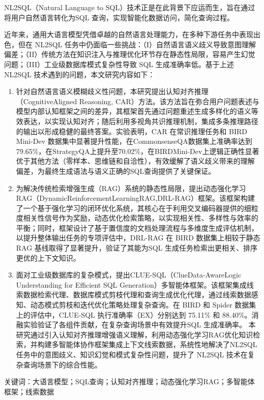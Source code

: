 \documentclass[12pt,a4paper,openright,UTF8]{ctexbook}
\begin{document}
NL2SQL（Natural Language to SQL）技术正是在此背景下应运而生，旨在通过将用户自然语言转化为SQL 查询，实现智能化数据访问，简化查询过程。


近年来，通用大语言模型凭借卓越的自然语言处理能力，在多种下游任务中表现出色，但在 NL2SQL 任务中仍面临一些挑战：（I）自然语言语义歧义导致意图理解偏差；（II）传统方法在知识注入与推理优化环节存在静态性局限，容易产生幻觉问题；（III）工业级数据库模式复杂性导致 SQL 生成准确率低。基于上述NL2SQL 技术遇到的问题，本文研究内容如下：

\begin{enumerate}[label=(\arabic*)]
\item 针对自然语言语义模糊歧义性问题，本研究提出认知对齐推理（CognitiveAligned Reasoning, CAR）方法。该方法旨在弥合用户问题表述与模型内部认知框架之间的差异，其框架首先通过问题重述生成多样化的语义等效表达，以实现认知对齐；随后利用多视角共识推理机制，集成多条推理路径的输出以形成稳健的最终答案。实验表明，CAR 在常识推理任务和 BIRD Mini-Dev 数据集中显著提升性能，在CommonsenseQA数据集上准确率达到79.65\%，在StrategyQA上提升至70.02\%，在BIRDMini-Dev上逻辑正确性显著优于其他方法（零样本、思维链和自洽性），有效缓解了语义歧义带来的理解偏差，为最终生成语法与语义正确的SQL查询提供了关键保证。
\item 为解决传统检索增强生成（RAG）系统的静态性局限，提出动态强化学习RAG（DynamicReinforcementLearningRAG,DRL-RAG）框架。该框架构建了一个基于强化学习的闭环优化系统，其核心在于利用交叉编码器提供的细粒度相关性信号作为奖励，动态优化检索策略，以实现相关性、多样性与效率的平衡；同时，框架设计了基于置信度的文档处理流程与多维度生成评估机制，以提升整体输出任务的专项评估中，DRL-RAG 在 BIRD 数据集上相较于静态 RAG 基线取得了显著提升，验证了其能为SQL 生成任务检索出更相关、排序更优的上下文知识。
\item 面对工业级数据库的复杂模式，提出CLUE-SQL（ClueData-AwareLogic Understanding for Efficient SQL Generation）多智能体框架。该框架集成线索数据检索代理、数据库模式剪枝代理和查询生成优化代理，通过线索数据感知、动态模式剪枝和迭代优化策略处理复杂查询。在 BIRD 和 Spider 数据集上的评估中，CLUE-SQL 执行准确率（EX）分别达到 75.11\% 和 88.40\%。消融实验验证了各组件贡献，在复杂查询场景中有效提升SQL 生成准确率。 本研究通过引入认知对齐推理增强语义理解，利用动态强化学习RAG优化知识检索，并构建多智能体协作框架集成上下文线索数据，系统性地解决了NL2SQL任务中的意图歧义、知识幻觉和模式复杂性问题，提升了 NL2SQL 技术在复杂查询场景下的综合性能。
\end{enumerate}


关键词：大语言模型；SQL查询；认知对齐推理；动态强化学习RAG；多智能体框架；线索数据
\end{document}
